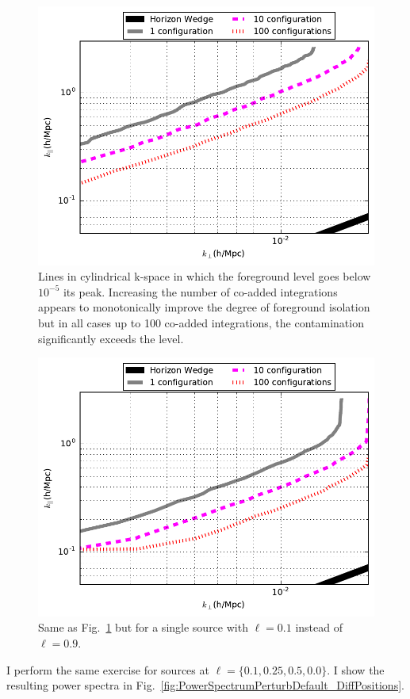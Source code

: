 \documentclass[a4paper,fleqn,usenatbib]{mnras}
\begin{document}
\begin{figure}
\includegraphics[width=.5\textwidth]{wedgeCompare_217_dAnt_2_dAntPos_3_offZenith_p9.pdf}
\caption{Lines in cylindrical k-space in which the foreground level goes below $10^{-5}$ its peak. Increasing the number of co-added integrations appears to monotonically improve the degree of foreground isolation but in all cases up to 100 co-added integrations, the contamination significantly exceeds the level. }
\label{fig:CompareContoursIntegrations}
\end{figure}


\begin{figure}
\includegraphics[width=.5\textwidth]{wedgeCompare_217_dAnt_2_dAntPos_3_offcenterleast_p9.pdf}
\caption{Same as Fig.~\ref{fig:CompareContoursIntegrations} but for a single source with $\ell=0.1$ instead of $\ell=0.9$. }
\label{fig:CompareContoursIntegrations_nearZenith}
\end{figure}


I perform the same exercise for sources at $\ell = \{0.1,0.25,0.5,0.0\}$. I show the resulting power spectra in Fig.~\ref{fig:PowerSpectrumPerturbDefault_DiffPositions}.
\end{document}
